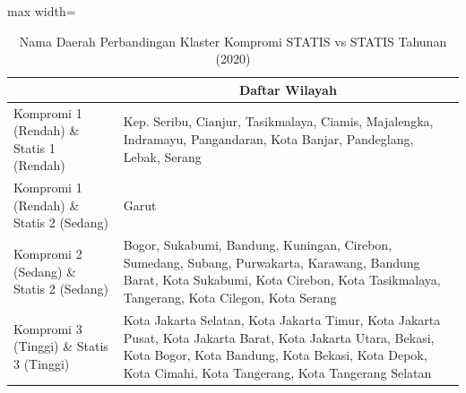 \begin{table}[H]
\centering
\caption{Nama Daerah Perbandingan Klaster Kompromi STATIS vs STATIS Tahunan (2020)} \label{tab:app1comp_statis_name_2020}
\begin{adjustbox}{max width=\textwidth}
\begin{tabular}{|>{\centering\arraybackslash}p{4cm}|p{10cm}|}
\hline
\multicolumn{1}{|c|}{\textbf{Kategori}} & \multicolumn{1}{c|}{\textbf{Daftar Wilayah}} \\
\hline
Kompromi 1 (Rendah) \& Statis 1 (Rendah) & Kep. Seribu, Cianjur, Tasikmalaya, Ciamis, Majalengka, Indramayu, Pangandaran, Kota Banjar, Pandeglang, Lebak, Serang \\
\hline
Kompromi 1 (Rendah) \& Statis 2 (Sedang) & Garut \\
\hline
Kompromi 2 (Sedang) \& Statis 2 (Sedang) & Bogor, Sukabumi, Bandung, Kuningan, Cirebon, Sumedang, Subang, Purwakarta, Karawang, Bandung Barat, Kota Sukabumi, Kota Cirebon, Kota Tasikmalaya, Tangerang, Kota Cilegon, Kota Serang \\
\hline
Kompromi 3 (Tinggi) \& Statis 3 (Tinggi) & Kota Jakarta Selatan, Kota Jakarta Timur, Kota Jakarta Pusat, Kota Jakarta Barat, Kota Jakarta Utara, Bekasi, Kota Bogor, Kota Bandung, Kota Bekasi, Kota Depok, Kota Cimahi, Kota Tangerang, Kota Tangerang Selatan \\
\hline
\end{tabular}
\end{adjustbox}
\end{table}
